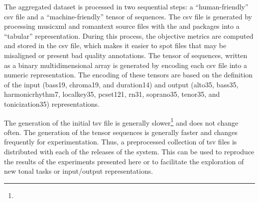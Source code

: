 
The aggregated dataset is processed in two sequential steps:
a ``human-friendly'' \gls{csv} file and a
``machine-friendly'' tensor of sequences. The \gls{csv} file
is generated by processing \gls{musicxml} and
\gls{romantext} source files with the 
\textcite{cuthbert2010music21} and 
 packages into a ``tabular''
representation. During this process, the objective metrics
are computed and stored in the \gls{csv} file, which makes
it easier to spot files that may be misaligned or present
bad quality annotations. The tensor of sequences, written as
a binary  multidimensional array is generated by
encoding each \gls{csv} file into a numeric representation.
The encoding of these tensors are based on the definition of
the input (\gls{bass19}, \gls{chroma19}, and
\gls{duration14}) and output (\gls{alto35}, \gls{bass35},
\gls{harmonicrhythm7}, \gls{localkey35}, \gls{pcset121},
\gls{rn31}, \gls{soprano35}, \gls{tenor35}, and
\gls{tonicization35}) representations.

The generation of the initial \gls{tsv} file is generally
slower\footnote{} and does
not change often. The generation of the tensor sequences is
generally faster and changes frequently for experimentation.
Thus, a preprocessed collection of \gls{tsv} files is
distributed with each of the releases of the system. This
can be used to reproduce the results of the experiments
presented here or to facilitate the exploration of new tonal
tasks or input/output representations.
